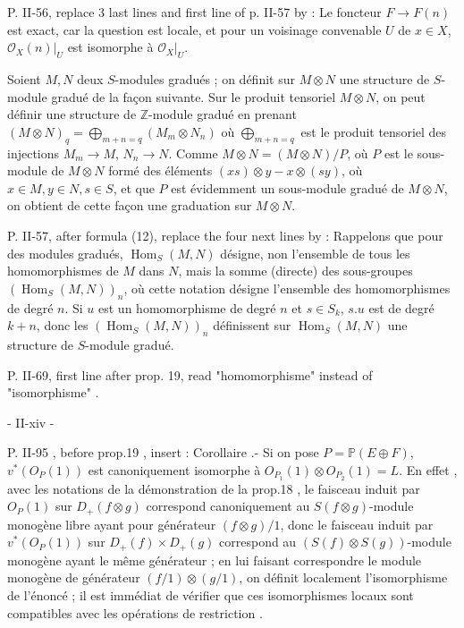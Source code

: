 P. II-56, replace 3 last lines and first line of p. II-57 by :
Le foncteur $F \to F(n)$ est exact, car la question est locale, et pour un voisinage convenable $U$ de $x \in X$, $\mathcal{O}_X(n)|_U$ est isomorphe à $\mathcal{O}_X|_U$.

Soient $M, N$ deux $S$-modules gradués ; on définit sur $M \otimes N$ une structure de $S$-module gradué de la façon suivante. Sur le produit tensoriel $M \otimes N$, on peut définir une structure de $\mathbb{Z}$-module gradué en prenant $(M \otimes N)_q = \bigoplus_{m+n=q} (M_m \otimes N_n)$ où $\bigoplus_{m+n=q}$ est le produit tensoriel des injections $M_m \to M$, $N_n \to N$. Comme $M \otimes N = (M \otimes N)/P$, où $P$ est le sous-module de $M \otimes N$ formé des éléments $(xs) \otimes y - x \otimes (sy)$, où $x \in M, y \in N, s \in S$, et que $P$ est évidemment un sous-module gradué de $M \otimes N$, on obtient de cette façon une graduation sur $M \otimes N$.

P. II-57, after formula (12), replace the four next lines by :
Rappelons que pour des modules gradués, $\operatorname{Hom}_S(M,N)$ désigne, non l'ensemble de tous les homomorphismes de $M$ dans $N$, mais la somme (directe) des sous-groupes $(\operatorname{Hom}_S(M,N))_n$, où cette notation désigne l'ensemble des homomorphismes de degré $n$. Si $u$ est un homomorphisme de degré $n$ et $s \in S_k$, $s.u$ est de degré $k+n$, donc les $(\operatorname{Hom}_S(M,N))_n$ définissent sur $\operatorname{Hom}_S(M,N)$ une structure de $S$-module gradué.

P. II-69, first line after prop. 19, read "homomorphisme" instead of "isomorphisme" .

\newpage


- II-xiv -

P. II-95 , before prop.19 , insert :
Corollaire .- Si on pose $P=\mathbb{P}(E \oplus F)$, $v^*(O_P(1))$ est canoniquement isomorphe à $O_{P_1}(1) \otimes O_{P_2}(1) = L$.
En effet , avec les notations de la démonstration de la prop.18 , le faisceau induit par $O_P(1)$ sur $D_+(f \otimes g)$ correspond canoniquement au $S(f \otimes g)$-module monogène libre ayant pour générateur $(f \otimes g)/1$, donc le faisceau induit par $v^*(O_P(1))$ sur $D_+(f) \times D_+(g)$ correspond au $(S(f) \otimes S(g))$-module monogène ayant le même générateur ; en lui faisant correspondre le module monogène de générateur $(f/1) \otimes (g/1)$, on définit localement l'isomorphisme de l'énoncé ; il est immédiat de vérifier que ces isomorphismes locaux sont compatibles avec les opérations de restriction .

